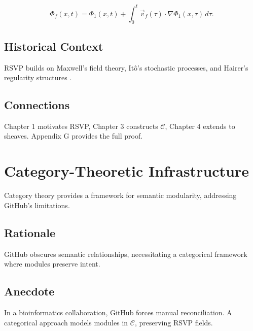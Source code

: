 \documentclass[12pt]{article}
\begin{document}
\[
\Phi_f(x, t) = \Phi_1(x, t) + \int_0^t \vec{v}_f(\tau) \cdot \nabla \Phi_1(x, \tau) \, d\tau.
\]

\subsection{Historical Context}
RSVP builds on Maxwell’s field theory, Itô’s stochastic processes, and Hairer’s regularity structures \cite{hairer2014theory}.

\subsection{Connections}
Chapter 1 motivates RSVP, Chapter 3 constructs $\mathcal{C}$, Chapter 4 extends to sheaves. Appendix G provides the full proof.

\begin{center}
\end{center}

\section{Category-Theoretic Infrastructure}
\label{sec:chapter3}

Category theory provides a framework for semantic modularity, addressing GitHub’s limitations.

\subsection{Rationale}
GitHub obscures semantic relationships, necessitating a categorical framework where modules preserve intent.

\subsection{Anecdote}
In a bioinformatics collaboration, GitHub forces manual reconciliation. A categorical approach models modules in $\mathcal{C}$, preserving RSVP fields.
\end{document}
